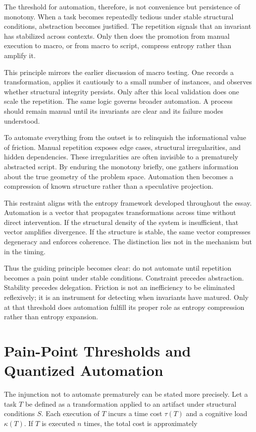 \documentclass[12pt]{article}
\begin{document}
The threshold for automation, therefore, is not convenience but persistence of monotony. When a task becomes repeatedly tedious under stable structural conditions, abstraction becomes justified. The repetition signals that an invariant has stabilized across contexts. Only then does the promotion from manual execution to macro, or from macro to script, compress entropy rather than amplify it.

This principle mirrors the earlier discussion of macro testing. One records a transformation, applies it cautiously to a small number of instances, and observes whether structural integrity persists. Only after this local validation does one scale the repetition. The same logic governs broader automation. A process should remain manual until its invariants are clear and its failure modes understood.

To automate everything from the outset is to relinquish the informational value of friction. Manual repetition exposes edge cases, structural irregularities, and hidden dependencies. These irregularities are often invisible to a prematurely abstracted script. By enduring the monotony briefly, one gathers information about the true geometry of the problem space. Automation then becomes a compression of known structure rather than a speculative projection.

This restraint aligns with the entropy framework developed throughout the essay. Automation is a vector that propagates transformations across time without direct intervention. If the structural density of the system is insufficient, that vector amplifies divergence. If the structure is stable, the same vector compresses degeneracy and enforces coherence. The distinction lies not in the mechanism but in the timing.

Thus the guiding principle becomes clear: do not automate until repetition becomes a pain point under stable conditions. Constraint precedes abstraction. Stability precedes delegation. Friction is not an inefficiency to be eliminated reflexively; it is an instrument for detecting when invariants have matured. Only at that threshold does automation fulfill its proper role as entropy compression rather than entropy expansion.

\section{Pain-Point Thresholds and Quantized Automation}

The injunction not to automate prematurely can be stated more precisely. Let a task $T$ be defined as a transformation applied to an artifact under structural conditions $S$. Each execution of $T$ incurs a time cost $\tau(T)$ and a cognitive load $\kappa(T)$. If $T$ is executed $n$ times, the total cost is approximately
\end{document}
